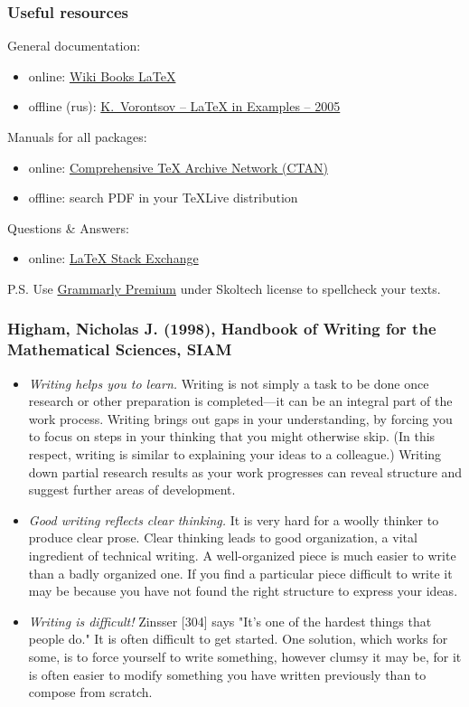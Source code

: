 \documentclass[mathserif]{beamer}
\begin{document}
\begin{frame}
    \frametitle{Useful resources}
    General documentation:
    \begin{itemize}
        \item online: \href{https://en.wikibooks.org/wiki/LaTeX}{Wiki Books \LaTeX}
        \item offline (rus): \href{http://www.ccas.ru/voron/download/voron05latex.pdf}
            {K.~Vorontsov -- \LaTeX{} in Examples -- 2005}
    \end{itemize}
    Manuals for all packages:
    \begin{itemize}
        \item online: \href{https://ctan.org/}{Comprehensive \TeX{} Archive Network (CTAN)}
        \item offline: search PDF in your TeXLive distribution
    \end{itemize}
    Questions \& Answers:
    \begin{itemize}
        \item online: \href{https://tex.stackexchange.com/}{\LaTeX{} Stack Exchange}
    \end{itemize}
    \footnotesize
    P.S. Use \href{https://grammarly.com/}{Grammarly Premium} under Skoltech license
    to spellcheck your texts.
\end{frame}

\begin{frame}
    \frametitle{Higham, Nicholas J. (1998), Handbook of Writing for the Mathematical Sciences, SIAM}
    \scriptsize
    \begin{itemize}
        \item \emph{Writing helps you to learn.} Writing is not simply a task to be done once
        research or other preparation is completed—it can be an integral part of
        the work process. Writing brings out gaps in your understanding, by forcing you to focus
        on steps in your thinking that you might otherwise skip. (In this respect,
        writing is similar to explaining your ideas to a colleague.) Writing down
        partial research results as your work progresses can reveal structure and
        suggest further areas of development.
        \item \emph{Good writing reflects clear thinking.} It is very hard for a woolly thinker
        to produce clear prose. Clear thinking leads to good organization, a vital
        ingredient of technical writing. A well-organized piece is much easier to
        write than a badly organized one. If you find a particular piece difficult to
        write it may be because you have not found the right structure to express
        your ideas.
        \item \emph{Writing is difficult!} Zinsser [304] says "It's one of the hardest things that
        people do." It is often difficult to get started. One solution, which works
        for some, is to force yourself to write something, however clumsy it may be,
        for it is often easier to modify something you have written previously than
        to compose from scratch.
    \end{itemize}
\end{frame}
\end{document}
